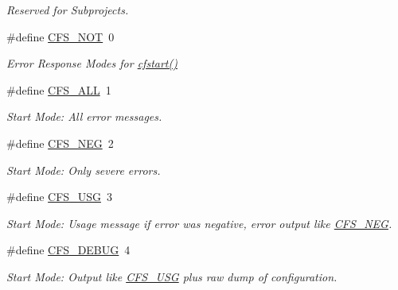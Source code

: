 \begin{DoxyCompactItemize}
\begin{DoxyCompactList}\small\item\em Reserved for Subprojects. \end{DoxyCompactList}\item 
\#define \hyperlink{group__cflib__core_gaf363125c0f5c520d748d8d0ecaf1af01}{C\-F\-S\-\_\-\-N\-O\-T}~0
\begin{DoxyCompactList}\small\item\em Error Response Modes for \hyperlink{group__cflib__core_ga6e04a462f9ad273de914af386ff15623}{cfstart()} \end{DoxyCompactList}\item 
\hypertarget{group__cflib__core_ga50bc281400629cfb20e899144d59a3b7}{\#define \hyperlink{group__cflib__core_ga50bc281400629cfb20e899144d59a3b7}{C\-F\-S\-\_\-\-A\-L\-L}~1}\label{group__cflib__core_ga50bc281400629cfb20e899144d59a3b7}

\begin{DoxyCompactList}\small\item\em Start Mode\-: All error messages. \end{DoxyCompactList}\item 
\hypertarget{group__cflib__core_ga5663cfeeda02fa9e2fee53b418c5045b}{\#define \hyperlink{group__cflib__core_ga5663cfeeda02fa9e2fee53b418c5045b}{C\-F\-S\-\_\-\-N\-E\-G}~2}\label{group__cflib__core_ga5663cfeeda02fa9e2fee53b418c5045b}

\begin{DoxyCompactList}\small\item\em Start Mode\-: Only severe errors. \end{DoxyCompactList}\item 
\hypertarget{group__cflib__core_ga3f535ad957f1836dea64deae798324a5}{\#define \hyperlink{group__cflib__core_ga3f535ad957f1836dea64deae798324a5}{C\-F\-S\-\_\-\-U\-S\-G}~3}\label{group__cflib__core_ga3f535ad957f1836dea64deae798324a5}

\begin{DoxyCompactList}\small\item\em Start Mode\-: Usage message if error was negative, error output like \hyperlink{group__cflib__core_ga5663cfeeda02fa9e2fee53b418c5045b}{C\-F\-S\-\_\-\-N\-E\-G}. \end{DoxyCompactList}\item 
\hypertarget{group__cflib__core_ga870957fdc2246ddc767747f8dd645bdf}{\#define \hyperlink{group__cflib__core_ga870957fdc2246ddc767747f8dd645bdf}{C\-F\-S\-\_\-\-D\-E\-B\-U\-G}~4}\label{group__cflib__core_ga870957fdc2246ddc767747f8dd645bdf}

\begin{DoxyCompactList}\small\item\em Start Mode\-: Output like \hyperlink{group__cflib__core_ga3f535ad957f1836dea64deae798324a5}{C\-F\-S\-\_\-\-U\-S\-G} plus raw dump of configuration. \end{DoxyCompactList}\end{DoxyCompactItemize}

